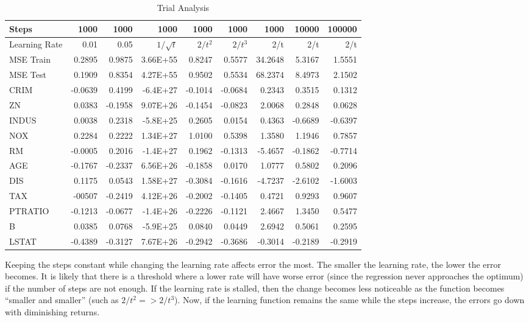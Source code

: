\documentclass[12pt, letterpaper]{report}
\begin{document}
\begin{table}[H]
	\centering
	\begin{tabular}{ |l|r|r|r|r|r|r|r|r| }
		\hline
		Steps & 1000 & 1000 & 1000 & 1000 & 1000 & 1000 & 10000 & 100000 \\
		\hline
		Learning Rate & 0.01 & 0.05 & $1/\sqrt{t}$ & $2/t^{2}$ & $2/t^{3}$ & 2/t & 2/t & 2/t \\
		\hline
		MSE Train & 0.2895 & 0.9875 & 3.66E+55 & 0.8247 & 0.5577 & 34.2648 & 5.3167 & 1.5551 \\
		\hline
		MSE Test & 0.1909 & 0.8354 & 4.27E+55 & 0.9502 & 0.5534 & 68.2374 & 8.4973 & 2.1502 \\
		\hline
		CRIM & -0.0639 & 0.4199 & -6.4E+27 & -0.1014 & -0.0684 & 0.2343 & 0.3515 & 0.1312 \\
		\hline
		ZN & 0.0383 & -0.1958 & 9.07E+26 & -0.1454 & -0.0823 & 2.0068 & 0.2848 & 0.0628 \\
		\hline
		INDUS & 0.0038 & 0.2318 & -5.8E+25 & 0.2605 & 0.0154 & 0.4363 & -0.6689 & -0.6397 \\
		\hline
		NOX & 0.2284 & 0.2222 & 1.34E+27 & 1.0100 & 0.5398 & 1.3580 & 1.1946 & 0.7857 \\
		\hline
		RM & -0.0005 & 0.2016 & -1.4E+27 & 0.1962 & -0.1313 & -5.4657 & -0.1862 & -0.7714\\
		\hline
		AGE & -0.1767 & -0.2337 & 6.56E+26 & -0.1858 & 0.0170 & 1.0777 & 0.5802 & 0.2096 \\
		\hline
		DIS & 0.1175 & 0.0543 & 1.58E+27 & -0.3084 & -0.1616 & -4.7237 & -2.6102 & -1.6003 \\
		\hline
		TAX & -00507 & -0.2419 & 4.12E+26 & -0.2002 & -0.1405 & 0.4721 & 0.9293 & 0.9607 \\
		\hline
		PTRATIO & -0.1213 & -0.0677 & -1.4E+26 & -0.2226 & -0.1121 & 2.4667 & 1.3450 & 0.5477 \\
		\hline
		B & 0.0385 & 0.0768 & -5.9E+25 & 0.0840 & 0.0449 & 2.6942 & 0.5061 & 0.2595 \\
		\hline
		LSTAT & -0.4389 & -0.3127 & 7.67E+26 & -0.2942 & -0.3686 & -0.3014 & -0.2189 & -0.2919 \\
		\hline
	\end{tabular}
	\caption{Trial Analysis}
\end{table}
	
Keeping the steps constant while changing the learning rate affects error the most.  The smaller the learning rate, the lower the error becomes.  It is likely that there is a threshold where a lower rate will have worse error (since the regression never approaches the optimum) if the number of steps are not enough.  If the learning rate is stalled, then the change becomes less noticeable as the function becomes “smaller and smaller” (such as $2/t^{2} => 2/t^{3}$).  Now, if the learning function remains the same while the steps increase, the errors go down with diminishing returns.
\end{document}
